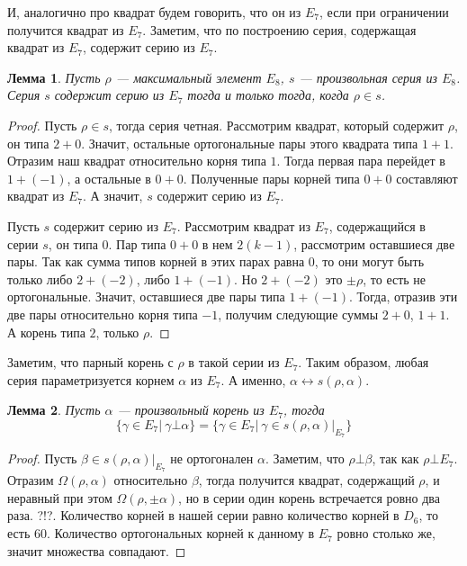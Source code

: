 \documentclass[a4paper,12pt]{amsart}
\theoremstyle{plain}
\newtheorem{lemma}{Лемма}
\theoremstyle{remark}
\theoremstyle{definition}
\begin{document}
И, аналогично про квадрат будем говорить, что он из $E_7$, если при ограничении получится квадрат из $E_7$.
Заметим, что по построению серия, содержащая квадрат из $E_7$, содержит серию из $E_7$.

\begin{lemma}
Пусть $\rho$ --- максимальный элемент $E_8$, $s$ --- произвольная серия из $E_8$. Серия $s$ содержит серию из $E_7$ тогда и только тогда, когда $\rho \in s$.
\end{lemma}
\begin{proof}
Пусть $\rho \in s$, тогда серия четная. Рассмотрим квадрат, который содержит $\rho$, он типа $2+0$. Значит, остальные ортогональные пары этого квадрата типа $1+1$. Отразим наш квадрат относительно корня типа $1$. Тогда первая пара перейдет в $1+(-1)$, а остальные в $0+0$. Полученные пары корней типа  $0+0$ составляют квадрат из $E_7$. А значит, $s$ содержит серию из $E_7$.


Пусть $s$ содержит серию из $E_7$. Рассмотрим квадрат из $E_7$, содержащийся в серии $s$, он типа $0$. Пар типа $0+0$ в нем $2(k-1)$, рассмотрим оставшиеся две пары. Так как сумма типов корней в этих парах равна $0$, то они могут быть только либо $2+(-2)$, либо $1+(-1)$. Но $2+(-2)$ это $\pm\rho$, то есть не ортогональные. Значит, оставшиеся две пары типа $1+(-1)$. Тогда, отразив эти две пары относительно корня типа $-1$, получим следующие суммы $2+0$, $1+1$. А корень типа $2$, только $\rho$.
\end{proof}

Заметим, что парный корень с $\rho$ в такой серии из $E_7$. Таким образом, любая серия параметризуется корнем $\alpha$ из $E_7$. А именно, $\alpha \leftrightarrow s(\rho,\alpha)$.

\begin{lemma}
Пусть $\alpha$ --- произвольный корень из $E_7$, тогда
    $$\{\gamma\in E_7|~ \gamma \bot \alpha \} = \{\gamma\in E_7|~ \gamma \in s(\rho,\alpha)|_{E_7}\}$$
\end{lemma}
\begin{proof}
Пусть $\beta \in s(\rho,\alpha)|_{E_7}$ не ортогонален $\alpha$.
Заметим, что $\rho \bot \beta$, так как $\rho \bot E_7$. Отразим $\Omega(\rho,\alpha)$ относительно $\beta$, тогда получится квадрат, содержащий $\rho$, и неравный при этом $\Omega(\rho,\pm\alpha)$, но в серии один корень встречается ровно два раза. ?!?.
Количество корней в нашей серии равно количество корней в $D_6$, то есть 60. Количество ортогональных корней к данному в $E_7$ ровно столько же, значит множества совпадают.
\end{proof}
\end{document}
